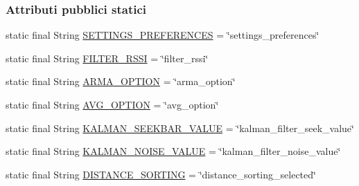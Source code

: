 \subsubsection*{Attributi pubblici statici}
\begin{DoxyCompactItemize}
\item 
static final String \hyperlink{classit_1_1unibo_1_1torsello_1_1bluetoothpositioning_1_1constant_1_1SettingConstants_ae1b406c787a7efb87d585d5c8b80493d_ae1b406c787a7efb87d585d5c8b80493d}{S\+E\+T\+T\+I\+N\+G\+S\+\_\+\+P\+R\+E\+F\+E\+R\+E\+N\+C\+ES} = \char`\"{}settings\+\_\+preferences\char`\"{}
\item 
static final String \hyperlink{classit_1_1unibo_1_1torsello_1_1bluetoothpositioning_1_1constant_1_1SettingConstants_a60a6d73ab1d42653b8a0c5b10c1c80c5_a60a6d73ab1d42653b8a0c5b10c1c80c5}{F\+I\+L\+T\+E\+R\+\_\+\+R\+S\+SI} = \char`\"{}filter\+\_\+rssi\char`\"{}
\item 
static final String \hyperlink{classit_1_1unibo_1_1torsello_1_1bluetoothpositioning_1_1constant_1_1SettingConstants_ad8f1f7986a4558736769604d606f53a1_ad8f1f7986a4558736769604d606f53a1}{A\+R\+M\+A\+\_\+\+O\+P\+T\+I\+ON} = \char`\"{}arma\+\_\+option\char`\"{}
\item 
static final String \hyperlink{classit_1_1unibo_1_1torsello_1_1bluetoothpositioning_1_1constant_1_1SettingConstants_a2c0b004552568f9813696b26b89b840c_a2c0b004552568f9813696b26b89b840c}{A\+V\+G\+\_\+\+O\+P\+T\+I\+ON} = \char`\"{}avg\+\_\+option\char`\"{}
\item 
static final String \hyperlink{classit_1_1unibo_1_1torsello_1_1bluetoothpositioning_1_1constant_1_1SettingConstants_a7ba43b29e467efb129d86c917734c94b_a7ba43b29e467efb129d86c917734c94b}{K\+A\+L\+M\+A\+N\+\_\+\+S\+E\+E\+K\+B\+A\+R\+\_\+\+V\+A\+L\+UE} = \char`\"{}kalman\+\_\+filter\+\_\+seek\+\_\+value\char`\"{}
\item 
static final String \hyperlink{classit_1_1unibo_1_1torsello_1_1bluetoothpositioning_1_1constant_1_1SettingConstants_a2751989834b974103dda417fb8b10337_a2751989834b974103dda417fb8b10337}{K\+A\+L\+M\+A\+N\+\_\+\+N\+O\+I\+S\+E\+\_\+\+V\+A\+L\+UE} = \char`\"{}kalman\+\_\+filter\+\_\+noise\+\_\+value\char`\"{}
\item 
static final String \hyperlink{classit_1_1unibo_1_1torsello_1_1bluetoothpositioning_1_1constant_1_1SettingConstants_ad86af94213ec3f11669289c4972c7658_ad86af94213ec3f11669289c4972c7658}{D\+I\+S\+T\+A\+N\+C\+E\+\_\+\+S\+O\+R\+T\+I\+NG} = \char`\"{}distance\+\_\+sorting\+\_\+selected\char`\"{}
\end{DoxyCompactItemize}


